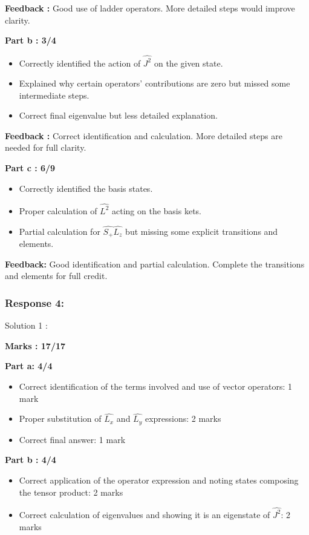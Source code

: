 \documentclass[a4paper,11pt]{article}
\begin{document}
\textbf{Feedback :}
Good use of ladder operators. More detailed steps would improve clarity.


\textbf{Part b : 3/4}
\begin{itemize}
    \item Correctly identified the action of $\hat{J^2}$ on the given state.
    \item Explained why certain operators' contributions are zero but missed some intermediate steps.
    \item Correct final eigenvalue but less detailed explanation.
\end{itemize}

\textbf{Feedback :}
Correct identification and calculation. More detailed steps are needed for full clarity.


\textbf{Part c : 6/9}
\begin{itemize}
    \item Correctly identified the basis states.
    \item Proper calculation of $\hat{L^2}$ acting on the basis kets.
    \item Partial calculation for $\hat{S_+}\hat{L_z}$ but missing some explicit transitions and elements.
\end{itemize}

\textbf{Feedback:}
Good identification and partial calculation. Complete the transitions and elements for full credit.


\subsubsection*{Response 4:}

Solution 1 :

\textbf{Marks : 17/17}

\textbf{Part a: 4/4}
\begin{itemize}
    \item Correct identification of the terms involved and use of vector operators: 1 mark
    \item Proper substitution of $\hat{L_x}$ and $\hat{L_y}$ expressions: 2 marks
    \item Correct final answer: 1 mark
\end{itemize}


\textbf{Part b : 4/4}
\begin{itemize}
    \item Correct application of the operator expression and noting states composing the tensor product: 2 marks
    \item Correct calculation of eigenvalues and showing it is an eigenstate of $\hat{J^2}$: 2 marks
\end{itemize}
\end{document}
